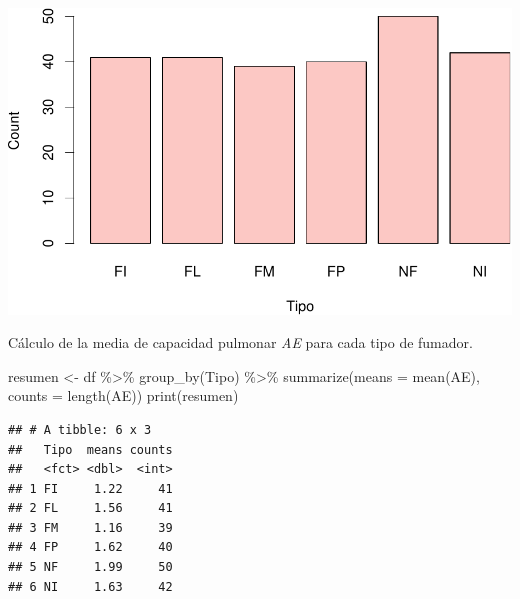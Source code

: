 \documentclass[
]{article}
\newenvironment{Shaded}{\begin{snugshade}}{\end{snugshade}}
\newcommand{\AttributeTok}[1]{\textcolor[rgb]{0.77,0.63,0.00}{#1}}
\newcommand{\FunctionTok}[1]{\textcolor[rgb]{0.00,0.00,0.00}{#1}}
\newcommand{\NormalTok}[1]{#1}
\newcommand{\OtherTok}[1]{\textcolor[rgb]{0.56,0.35,0.01}{#1}}
\newcommand{\SpecialCharTok}[1]{\textcolor[rgb]{0.00,0.00,0.00}{#1}}
\newcommand{\StringTok}[1]{\textcolor[rgb]{0.31,0.60,0.02}{#1}}
\begin{document}
\begin{Shaded}
\end{Shaded}

\includegraphics{A4_files/figure-latex/unnamed-chunk-20-1.pdf}

\newpage

Cálculo de la media de capacidad pulmonar \emph{AE} para cada tipo de
fumador.

\vspace{0.3cm}

\begin{Shaded}
\begin{Highlighting}[]
\NormalTok{resumen }\OtherTok{\textless{}{-}}\NormalTok{ df }\SpecialCharTok{\%\textgreater{}\%}
    \FunctionTok{group\_by}\NormalTok{(Tipo) }\SpecialCharTok{\%\textgreater{}\%}
    \FunctionTok{summarize}\NormalTok{(}\AttributeTok{means =} \FunctionTok{mean}\NormalTok{(AE), }\AttributeTok{counts =} \FunctionTok{length}\NormalTok{(AE))}
\FunctionTok{print}\NormalTok{(resumen)}
\end{Highlighting}
\end{Shaded}

\begin{verbatim}
## # A tibble: 6 x 3
##   Tipo  means counts
##   <fct> <dbl>  <int>
## 1 FI     1.22     41
## 2 FL     1.56     41
## 3 FM     1.16     39
## 4 FP     1.62     40
## 5 NF     1.99     50
## 6 NI     1.63     42
\end{verbatim}
\end{document}
